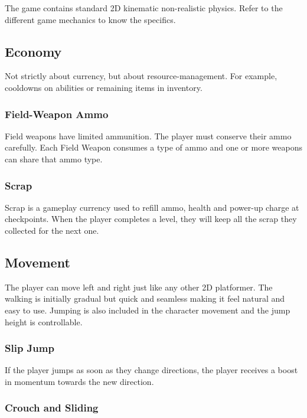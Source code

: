 \documentclass[12pt]{article}
\begin{document}
The game contains standard 2D kinematic non-realistic physics. Refer to the different game mechanics to know the specifics.

\subsection{Economy}

Not strictly about currency, but about resource-management. For example, cooldowns on abilities or remaining items in inventory. 

\subsubsection{Field-Weapon Ammo}

Field weapons have limited ammunition. The player must conserve their ammo carefully. Each Field Weapon consumes a type of ammo and one or more weapons can share that ammo type. 

\subsubsection{Scrap}

Scrap is a gameplay currency used to refill ammo, health and power-up charge at checkpoints. When the player completes a level, they will keep all the scrap they collected for the next one.  

\subsection{Movement}

The player can move left and right just like any other 2D platformer. The walking is initially gradual but quick and seamless making it feel natural and easy to use. Jumping is also included in the character movement and the jump height is controllable.

\subsubsection{Slip Jump}

If the player jumps as soon as they change directions, the player receives a boost in momentum towards the new direction.

\subsubsection{Crouch and Sliding}
\end{document}
